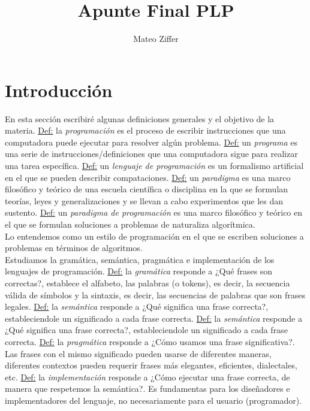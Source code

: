 \documentclass[12pt]{extarticle}
\author{Mateo Ziffer}
\title{Apunte Final PLP}
\def\definicion{\newline\underline{Def:} }
\begin{document}
\maketitle{}
\tableofcontents
\newpage \section{Introducción}
En esta sección escribiré algunas definiciones generales y el objetivo de la materia.
\definicion la \textit{programación} es el proceso de escribir instrucciones que una computadora puede ejecutar para resolver algún problema.
\definicion un \textit{programa} es una serie de instrucciones/definiciones que una computadora sigue para realizar una tarea específica.
\definicion un \textit{lenguaje de programación} es un formalismo artificial en el que se pueden describir compataciones.
\definicion un \textit{paradigma} es una marco filosófico y teórico de una escuela científica o disciplina en la que se formulan teorías, leyes y generalizaciones y se llevan a cabo experimentos que les dan sustento.
\definicion un \textit{paradigma de programación} es una marco filosófico y teórico en el que se formulan soluciones a problemas de naturaliza algorítmica. \\
Lo entendemos como un estilo de programación en el que se escriben soluciones a problemas en términos de algoritmos. \\

Estudiamos la gramática, semántica, pragmática e implementación de los lenguajes de programación.
\definicion la \textit{gramática} responde a ¿Qué frases son correctas?, establece el alfabeto, las palabras (o tokens), es decir, la secuencia válida de símbolos y la sintaxis, es decir, las secuencias de palabras que son frases legales.
\definicion la \textit{semántica} responde a ¿Qué significa una frase correcta?, estableciendole un significado a cada frase correcta.
\definicion la \textit{semántica} responde a ¿Qué significa una frase correcta?, estableciendole un significado a cada frase correcta.
\definicion la \textit{pragmática} responde a ¿Cómo usamos una frase significativa?. Las frases con el mismo significado pueden usarse de diferentes maneras, diferentes contextos pueden requerir frases más elegantes, eficientes, dialectales, etc.
\definicion la \textit{implementación} responde a ¿Cómo ejecutar una frase correcta, de manera que respetemos la semántica?. Es fundamentas para los diseñadores e implementadores del lenguaje, no necesariamente para el usuario (programador).
\end{document}
